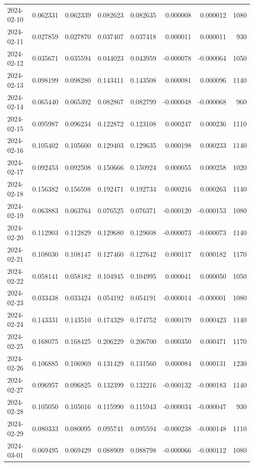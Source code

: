 \begin{tabular}{lrrrrrrr}
2024-02-10 & 0.062331 & 0.062339 & 0.082623 & 0.082635 & 0.000008 & 0.000012 & 1080 \\
2024-02-11 & 0.027859 & 0.027870 & 0.037407 & 0.037418 & 0.000011 & 0.000011 & 930 \\
2024-02-12 & 0.035671 & 0.035594 & 0.044023 & 0.043959 & -0.000078 & -0.000064 & 1050 \\
2024-02-13 & 0.098199 & 0.098280 & 0.143411 & 0.143508 & 0.000081 & 0.000096 & 1140 \\
2024-02-14 & 0.065440 & 0.065392 & 0.082867 & 0.082799 & -0.000048 & -0.000068 & 960 \\
2024-02-15 & 0.095987 & 0.096234 & 0.122872 & 0.123108 & 0.000247 & 0.000236 & 1110 \\
2024-02-16 & 0.105402 & 0.105600 & 0.129403 & 0.129635 & 0.000198 & 0.000233 & 1140 \\
2024-02-17 & 0.092453 & 0.092508 & 0.150666 & 0.150924 & 0.000055 & 0.000258 & 1020 \\
2024-02-18 & 0.156382 & 0.156598 & 0.192471 & 0.192734 & 0.000216 & 0.000263 & 1140 \\
2024-02-19 & 0.063883 & 0.063764 & 0.076525 & 0.076371 & -0.000120 & -0.000153 & 1080 \\
2024-02-20 & 0.112903 & 0.112829 & 0.129680 & 0.129608 & -0.000073 & -0.000073 & 1140 \\
2024-02-21 & 0.108030 & 0.108147 & 0.127460 & 0.127642 & 0.000117 & 0.000182 & 1170 \\
2024-02-22 & 0.058141 & 0.058182 & 0.104945 & 0.104995 & 0.000041 & 0.000050 & 1050 \\
2024-02-23 & 0.033438 & 0.033424 & 0.054192 & 0.054191 & -0.000014 & -0.000001 & 1080 \\
2024-02-24 & 0.143331 & 0.143510 & 0.174329 & 0.174752 & 0.000179 & 0.000423 & 1140 \\
2024-02-25 & 0.168075 & 0.168425 & 0.206229 & 0.206700 & 0.000350 & 0.000471 & 1170 \\
2024-02-26 & 0.106885 & 0.106969 & 0.131429 & 0.131560 & 0.000084 & 0.000131 & 1230 \\
2024-02-27 & 0.096957 & 0.096825 & 0.132399 & 0.132216 & -0.000132 & -0.000183 & 1140 \\
2024-02-28 & 0.105050 & 0.105016 & 0.115990 & 0.115943 & -0.000034 & -0.000047 & 930 \\
2024-02-29 & 0.080333 & 0.080095 & 0.095741 & 0.095594 & -0.000238 & -0.000148 & 1110 \\
2024-03-01 & 0.069495 & 0.069429 & 0.088909 & 0.088798 & -0.000066 & -0.000112 & 1080 \\

\end{tabular}
